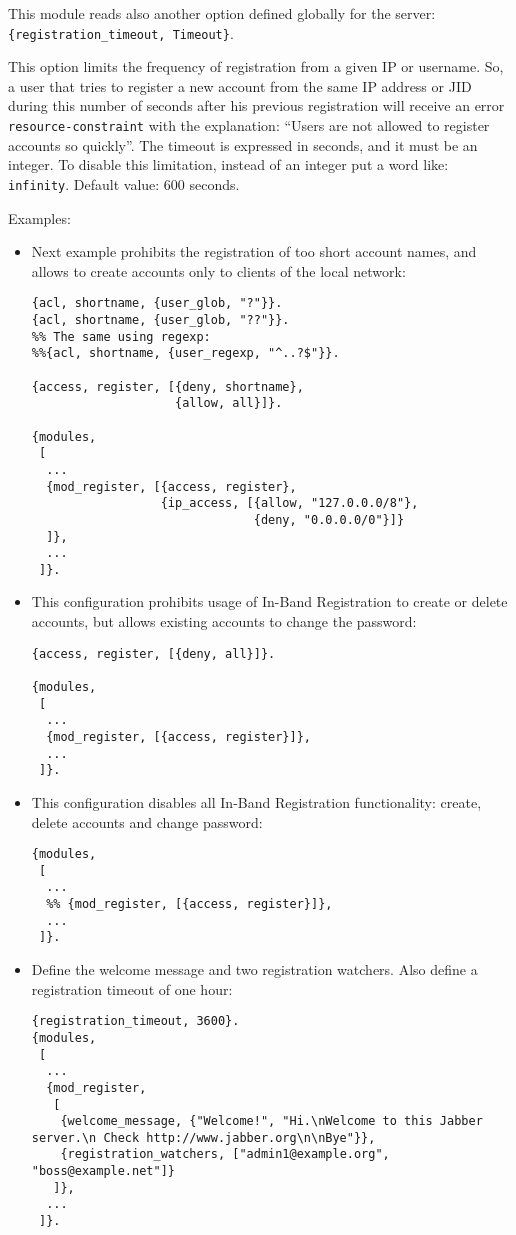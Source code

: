 \documentclass[a4paper,10pt]{book}
\newcommand{\ind}[1]{\begin{latexonly}\index{#1}\end{latexonly}}
\newcommand{\term}[1]{\texttt{#1}}
\begin{document}
This module reads also another option defined globally for the server:
\term{\{registration\_timeout, Timeout\}}. \ind{options!registratimeout}
This option limits the frequency of registration from a given IP or username.
So, a user that tries to register a new account from the same IP address or JID during
this number of seconds after his previous registration
will receive an error \term{resource-constraint} with the explanation:
``Users are not allowed to register accounts so quickly''.
The timeout is expressed in seconds, and it must be an integer.
To disable this limitation,
instead of an integer put a word like: \term{infinity}.
Default value: 600 seconds.

Examples:
\begin{itemize}
\item Next example prohibits the registration of too short account names,
and allows to create accounts only to clients of the local network:
\begin{verbatim}
{acl, shortname, {user_glob, "?"}}.
{acl, shortname, {user_glob, "??"}}.
%% The same using regexp:
%%{acl, shortname, {user_regexp, "^..?$"}}.

{access, register, [{deny, shortname},
                    {allow, all}]}.

{modules,
 [
  ...
  {mod_register, [{access, register},
                  {ip_access, [{allow, "127.0.0.0/8"},
                               {deny, "0.0.0.0/0"}]}
  ]},
  ...
 ]}.
\end{verbatim}
\item This configuration prohibits usage of In-Band Registration
  to create or delete accounts,
  but allows existing accounts to change the password:
\begin{verbatim}
{access, register, [{deny, all}]}.

{modules,
 [
  ...
  {mod_register, [{access, register}]},
  ...
 ]}.
\end{verbatim}
\item 
  This configuration disables all In-Band Registration
  functionality: create, delete accounts and change password:
\begin{verbatim}
{modules,
 [
  ...
  %% {mod_register, [{access, register}]},
  ...
 ]}.
\end{verbatim}
\item Define the welcome message and two registration watchers.
Also define a registration timeout of one hour:
\begin{verbatim}
{registration_timeout, 3600}.
{modules,
 [
  ...
  {mod_register,
   [
    {welcome_message, {"Welcome!", "Hi.\nWelcome to this Jabber server.\n Check http://www.jabber.org\n\nBye"}},
    {registration_watchers, ["admin1@example.org", "boss@example.net"]}
   ]},
  ...
 ]}.
\end{verbatim}
\end{itemize}
\end{document}
